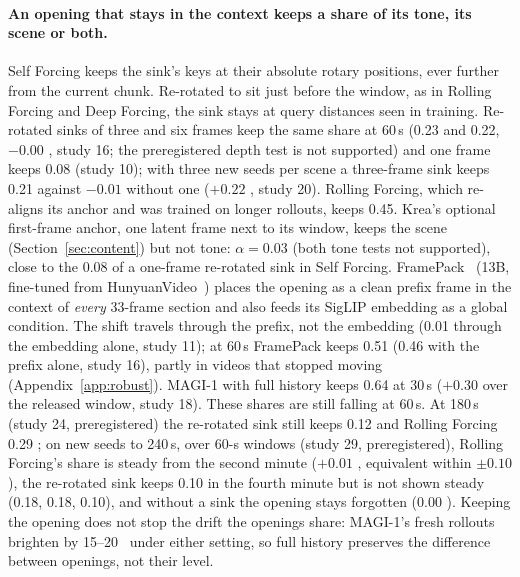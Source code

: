 \paragraph{An opening that stays in the context keeps a share of its tone, its scene or both.} Self Forcing keeps the sink's keys at their absolute
rotary positions, ever further from the current chunk. Re-rotated to sit just before the window, as in Rolling Forcing
and Deep Forcing, the sink stays at query distances seen in training. Re-rotated sinks of three and six frames keep
the same share at 60\,s (0.23 and 0.22, $-0.00$ , study 16; the preregistered depth test is not
supported) and one frame keeps 0.08 (study 10); with three new seeds per scene a three-frame sink keeps 0.21 against
$-0.01$ without one ($+0.22$ , study 20). Rolling Forcing, which re-aligns its
anchor and was trained on longer rollouts, keeps 0.45. Krea's optional first-frame anchor, one latent frame next to its
window, keeps the scene (Section~\ref{sec:content}) but not tone: $\alpha=0.03$  (both tone tests not
supported), close to the 0.08 of a one-frame re-rotated sink in Self Forcing. FramePack~\cite{framepack} (13B, fine-tuned from HunyuanVideo~\cite{hunyuan})
places the opening as a clean prefix frame in the context of \emph{every} 33-frame section and also feeds its SigLIP
embedding as a global condition. The shift travels through the prefix, not the embedding (0.01 
through the embedding alone, study 11); at 60\,s FramePack keeps 0.51  (0.46 with the prefix alone,
study 16), partly in videos that stopped moving (Appendix~\ref{app:robust}). MAGI-1 with full history keeps 0.64
 at 30\,s ($+0.30$  over the released window, study 18). These
shares are still falling at 60\,s. At 180\,s (study 24, preregistered) the re-rotated sink still keeps 0.12
 and Rolling Forcing 0.29 ; on new seeds to 240\,s, over 60-s windows (study 29,
preregistered), Rolling Forcing's share is steady from the second minute ($+0.01$ , equivalent
within $\pm0.10$), the re-rotated sink keeps 0.10  in the fourth minute but is not shown steady (0.18,
0.18, 0.10), and without a sink the opening stays forgotten (0.00 ). Keeping the
opening does not stop the drift the openings share: MAGI-1's fresh rollouts brighten by 15--20~\Lstar{} under either
setting, so full history preserves the difference between openings, not their level.

